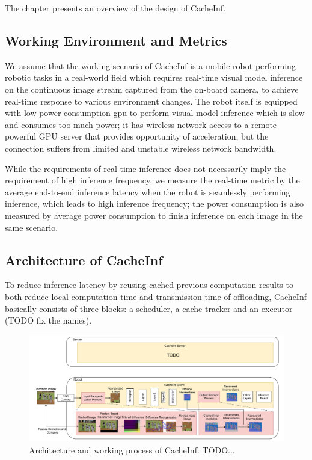 The chapter presents an overview of the design of CacheInf.

\subsection{Working Environment and Metrics}
We assume that the working scenario of CacheInf is a mobile robot performing robotic tasks in a real-world field which requires real-time visual model inference on the continuous image stream captured from the on-board camera, to achieve real-time response to various environment changes.
The robot itself is equipped with low-power-consumption gpu to perform visual model inference which is slow and consumes too much power; it has wireless network access to a remote powerful GPU server that provides opportunity of acceleration, but the connection suffers from limited and unstable wireless network bandwidth.

While the requirements of real-time inference does not necessarily imply the requirement of high inference frequency, we measure the real-time metric by the average end-to-end inference latency when the robot is seamlessly performing inference, which leads to high inference frequency; the power consumption is also measured by average power consumption to finish inference on each image in the same scenario.

\subsection{Architecture of CacheInf}
To reduce inference latency by reusing cached previous computation results to both reduce local computation time and transmission time of offloading, CacheInf basically consists of three blocks: a scheduler, a cache tracker and an executor (TODO fix the names).

\begin{figure}[!htb]
    \centering
    \includegraphics[width=\linewidth]{fig/overview.pdf}
    \caption[track]{Architecture and working process of CacheInf. TODO...}
    \label{fig:overview}
\end{figure}

